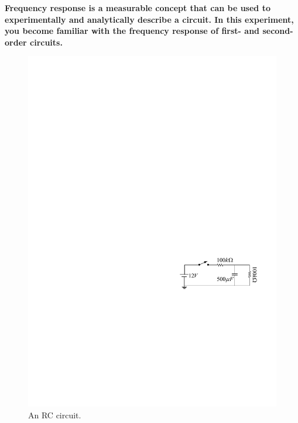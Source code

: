 \documentclass[11pt]{article}
\begin{document}
\textbf{Frequency response is a measurable concept that can be used to experimentally and analytically describe a circuit. In this experiment, you become familiar with the frequency response of first- and second-order circuits.
}



\begin{question}


\begin{figure}[H]
\centering
\includegraphics[scale=1.2,angle=0]{Fig/cir1.pdf}
\caption{An RC circuit.} \label{fig:cir1}
\end{figure}


\end{question}
\end{document}
